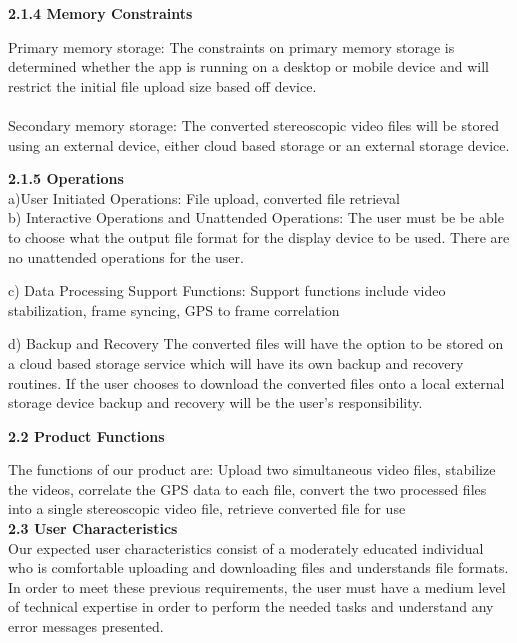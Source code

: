 \documentclass[10pt,draftclsnofoot,onecolumn]{IEEEtran}
\begin{document}
\vspace{5mm}

{\Medium\textbf{2.1.4 Memory Constraints}} \\
\vspace{5mm}

Primary memory storage: The constraints on primary memory storage is determined whether the app is running on a desktop or mobile device and will restrict the initial file upload size based off device. \\\vspace{2mm}
\\
			Secondary memory storage: The converted stereoscopic video files will be stored using an external device, either cloud based storage or an external storage device.

\vspace{5mm}

{\Medium\textbf{2.1.5 Operations}} \\
\vspace{5mm}
a)User Initiated Operations: File upload, converted file retrieval\\
\vspace{2mm}
b) Interactive Operations and Unattended Operations: The user must be be able to choose what the output file format for the display device to be used. There are no unattended operations for the user.\\
\vspace{2mm}

c) Data Processing Support Functions: Support functions include video stabilization, frame syncing, GPS to frame correlation

\vspace{2mm}

d) Backup and Recovery
	The converted files will have the option to be stored on a cloud based storage service which will have its own backup and recovery routines. If the user chooses to download the converted files onto a local external storage device backup and recovery will be the user’s responsibility.


	\vspace{5mm}

	{\Medium\textbf{2.2 Product Functions}} \\
	\vspace{5mm}

	The functions of our product are: Upload two simultaneous video files, stabilize the videos, correlate the GPS data to each file, convert the two processed files into a single stereoscopic video file, retrieve converted file for use \\
		\vspace{5mm}
	{\Medium\textbf{2.3 User Characteristics}} \\
		\vspace{5mm}
Our expected user characteristics consist of a moderately educated individual who is comfortable uploading and downloading files and understands file formats. In order to meet these previous requirements, the user must have a medium level of technical expertise in order to perform the needed tasks and understand any error messages presented. \\
\end{document}
